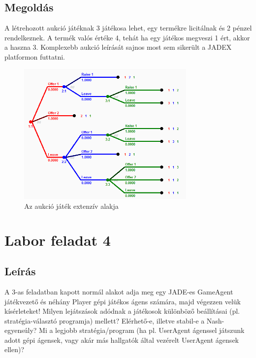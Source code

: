 \subsection{Megoldás}
A létrehozott aukció játéknak 3 játékosa lehet, egy termékre licitálnak és 2 pénzel rendelkeznek. A termék valós értéke 4, tehát ha egy játékos megveszi 1 ért, akkor a haszna 3.
Komplexebb aukció leírását sajnos most sem sikerült a JADEX platformon futtatni.
\begin{figure}[h]
\begin{center}
\includegraphics[height=7cm]{figures/auction.png}
\caption{Az aukció játék extenzív alakja}
\end{center}
\end{figure}


\section{Labor feladat 4}
\subsection{Leírás}A 3-as feladatban kapott normál alakot adja meg egy JADE-es GameAgent játékvezető és néhány Player gépi játékos ágens számára, majd végezzen velük kísérleteket! Milyen lejátszások adódnak a játékosok különböző beállításai (pl. stratégia-választó programja) mellett? Elérhető-e, illetve stabil-e a Nash-egyensúly? Mi a legjobb stratégia/program (ha pl. UserAgent ágenssel játszunk adott gépi ágensek, vagy akár más hallgatók által vezérelt UserAgent ágensek ellen)?   
